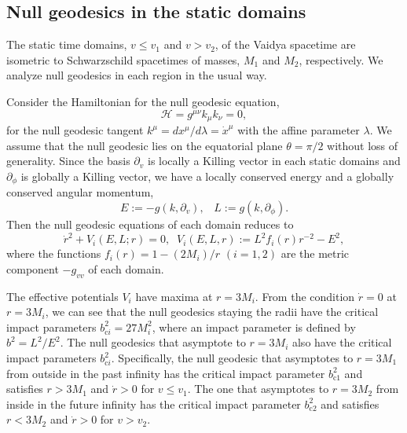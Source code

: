\documentclass[prd,showpacs,preprintnumbers,groupedaddress,superscriptaddress,nofootinbib,11pt]{revtex4-1} %
\theoremstyle{newplain}
\newcommand{\mr}[1]{\mathrm{#1}}
\begin{document}
\subsection{Null geodesics in the static domains}
The static time domains, $v\le v_1$ and $v>v_2$, of the Vaidya spacetime are isometric to Schwarzschild spacetimes of masses, $M_1$ and $M_2$, respectively.
We analyze null geodesics in each region in the usual way.
\par
Consider the Hamiltonian for the null geodesic equation,
\begin{equation}
\mathcal{H}=g^{\mu\nu}k_\mu k_\nu =0,
\end{equation}
for the null geodesic tangent $k^\mu=dx^\mu/d\lambda=\dot{x}^\mu$ with the affine parameter $\lambda$.
We assume that the null geodesic lies on the equatorial plane $\theta=\pi/2$ without loss of generality.
Since the basis $\partial_v$ is locally a Killing vector in each static domains and $\partial_\phi$ is globally a Killing vector, we have a locally conserved energy and a globally conserved angular momentum,
\begin{equation}
\label{eq:energy-angular-momentum}
E:=-g(k,\partial_v),\;\;\; L:=g(k,\partial_\phi).
\end{equation}
Then the null geodesic equations of each domain reduces to
\begin{equation}
\label{eq:potential-static}
\dot{r}^2+V_i(E,L;r)=0,\;\;V_i(E,L,r):=L^2f_i(r)r^{-2}-E^2,
\end{equation}
where the functions $f_i(r)=1-(2M_i)/r$ $(i=1,2)$ are the metric component $-g_{vv}$ of each domain.
\par
The effective potentials $V_i$ have maxima at $r=3M_i$.
From the condition $\dot{r}=0$ at $r=3M_i$, we can see that the null geodesics staying the radii have the critical impact parameters $b_{\mr{c}i}^2=27M_i^2$, where an impact parameter is defined by $b^2=L^2/E^2$.
The null geodesics that asymptote to $r=3M_i$ also have the critical impact parameters $b_{\mr{c}i}^2$.
Specifically, the null geodesic that asymptotes to $r=3M_1$ from outside in the past infinity has the critical impact parameter $b_{\mr{c}1}^2$ and satisfies $r>3M_1$ and $\dot{r}>0$ for $v\le v_1$.
The one that asymptotes to $r=3M_2$ from inside in the future infinity has the critical impact parameter $b_{\mr{c}2}^2$ and satisfies $r<3M_2$ and $\dot{r}>0$ for $v> v_2$.

\end{document}
